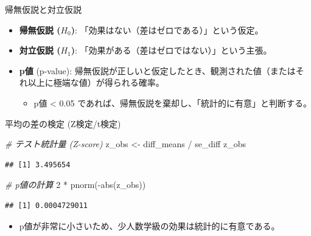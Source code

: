 \documentclass[
  ignorenonframetext,
]{beamer}
\newenvironment{Shaded}{\begin{snugshade}}{\end{snugshade}}
\newcommand{\CommentTok}[1]{\textcolor[rgb]{0.56,0.35,0.01}{\textit{#1}}}
\newcommand{\DecValTok}[1]{\textcolor[rgb]{0.00,0.00,0.81}{#1}}
\newcommand{\FunctionTok}[1]{\textcolor[rgb]{0.00,0.00,0.00}{#1}}
\newcommand{\NormalTok}[1]{#1}
\newcommand{\OtherTok}[1]{\textcolor[rgb]{0.56,0.35,0.01}{#1}}
\newcommand{\SpecialCharTok}[1]{\textcolor[rgb]{0.00,0.00,0.00}{#1}}
\providecommand{\tightlist}{%
  \setlength{\itemsep}{0pt}\setlength{\parskip}{0pt}}
\begin{document}
\begin{frame}{帰無仮説と対立仮説}
\protect\hypertarget{ux5e30ux7121ux4eeeux8aacux3068ux5bfeux7acbux4eeeux8aac}{}
\begin{itemize}
\tightlist
\item
  \textbf{帰無仮説 (\(H_0\))}:
  「効果はない（差はゼロである）」という仮定。
\item
  \textbf{対立仮説 (\(H_1\))}:
  「効果がある（差はゼロではない）」という主張。
\item
  \textbf{p値} (p-value):
  帰無仮説が正しいと仮定したとき、観測された値（またはそれ以上に極端な値）が得られる確率。

  \begin{itemize}
  \tightlist
  \item
    p値 \textless{} 0.05
    であれば、帰無仮説を棄却し、「統計的に有意」と判断する。
  \end{itemize}
\end{itemize}
\end{frame}

\begin{frame}[fragile]{平均の差の検定 (Z検定/t検定)}
\protect\hypertarget{ux5e73ux5747ux306eux5deeux306eux691cux5b9a-zux691cux5b9atux691cux5b9a}{}
\scriptsize

\begin{Shaded}
\begin{Highlighting}[]
\CommentTok{\# テスト統計量 (Z{-}score)}
\NormalTok{z\_obs }\OtherTok{\textless{}{-}}\NormalTok{ diff\_means }\SpecialCharTok{/}\NormalTok{ se\_diff}
\NormalTok{z\_obs}
\end{Highlighting}
\end{Shaded}

\begin{verbatim}
## [1] 3.495654
\end{verbatim}

\begin{Shaded}
\begin{Highlighting}[]
\CommentTok{\# p値の計算}
\DecValTok{2} \SpecialCharTok{*} \FunctionTok{pnorm}\NormalTok{(}\SpecialCharTok{{-}}\FunctionTok{abs}\NormalTok{(z\_obs))}
\end{Highlighting}
\end{Shaded}

\begin{verbatim}
## [1] 0.0004729011
\end{verbatim}

\normalsize

\begin{itemize}
\tightlist
\item
  p値が非常に小さいため、少人数学級の効果は統計的に有意である。
\end{itemize}
\end{frame}
\end{document}
